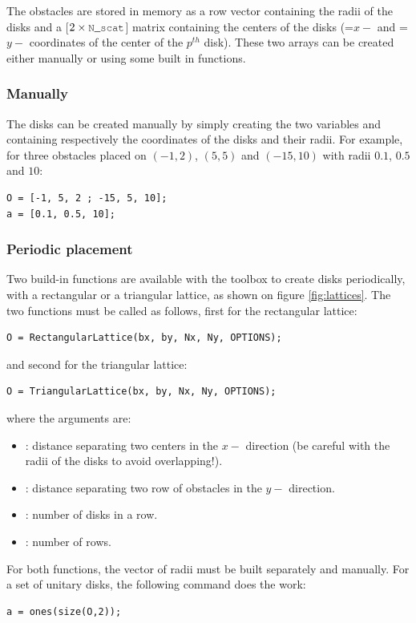 The obstacles are stored in memory as a row vector  containing the radii of the disks and a [$2\times\code{N\_scat}$] matrix  containing the centers of the disks (=$x-$ and =$y-$ coordinates of the center of the $p^{th}$ disk). These two arrays can be created either manually or using some built in functions.

\subsubsection{Manually}

The disks can be created manually by simply creating the two variables  and  containing respectively the coordinates of the disks and their radii. For example, for three obstacles placed on $(-1,2)$, $(5,5)$ and $(-15,10)$ with radii $0.1$, $0.5$ and $10$:
\begin{lstlisting}
O = [-1, 5, 2 ; -15, 5, 10];
a = [0.1, 0.5, 10];
\end{lstlisting}

\subsubsection{Periodic placement}

Two build-in functions are available with the toolbox to create disks periodically, with a rectangular or a triangular lattice, as shown on figure \ref{fig:lattices}. The two functions must be called as follows, first for the rectangular lattice:
\begin{lstlisting}
O = RectangularLattice(bx, by, Nx, Ny, OPTIONS);
\end{lstlisting}
and second for the triangular lattice:
\begin{lstlisting}
O = TriangularLattice(bx, by, Nx, Ny, OPTIONS);
\end{lstlisting}
where the arguments are:
\begin{itemize}
\item {}: distance separating two centers in the $x-$ direction (be careful with the radii of the disks to avoid overlapping!).
\item {}: distance separating two row of obstacles in the $y-$ direction.
\item {}: number of disks in a row.
\item {}: number of rows.
\end{itemize}
For both functions, the vector of radii must be built separately and manually. For a set of unitary disks, the following command does the work:
\begin{lstlisting}
a = ones(size(O,2));
\end{lstlisting}

